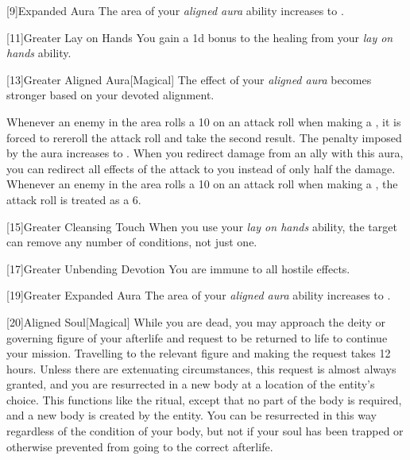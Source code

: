         [9]{Expanded Aura}
        The area of your \textit{aligned aura} ability increases to \arealarge.

        [11]{Greater Lay on Hands} 
        You gain a \plus1d bonus to the healing from your \textit{lay on hands} ability.

        [13]{Greater Aligned Aura}[Magical]
        The effect of your \textit{aligned aura} becomes stronger based on your devoted alignment.

         Whenever an enemy in the area rolls a 10 on an attack roll when making a , it is forced to rereroll the attack roll and take the second result.
         The penalty imposed by the aura increases to .
         When you redirect damage from an ally with this aura, you can redirect all effects of the attack to you instead of only half the damage.
         Whenever an enemy in the area rolls a 10 on an attack roll when making a , the attack roll is treated as a 6.

        [15]{Greater Cleansing Touch} When you use your \textit{lay on hands} ability, the target can remove any number of conditions, not just one.

        [17]{Greater Unbending Devotion}
        You are immune to all hostile  effects.

        [19]{Greater Expanded Aura} The area of your \textit{aligned aura} ability increases to \areahuge.

        [20]{Aligned Soul}[Magical]
        While you are dead, you may approach the deity or governing figure of your afterlife and request to be returned to life to continue your mission.
        Travelling to the relevant figure and making the request takes 12 hours.
        Unless there are extenuating circumstances, this request is almost always granted, and you are resurrected in a new body at a location of the entity's choice.
        This functions like the  ritual, except that no part of the body is required, and a new body is created by the entity.
        You can be resurrected in this way regardless of the condition of your body, but not if your soul has been trapped or otherwise prevented from going to the correct afterlife.

